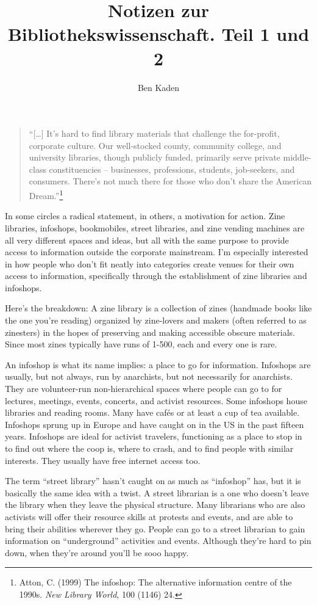 \documentclass[output=paper]{langscibook}
\title{Notizen zur Bibliothekswissenschaft. Teil 1 und 2}
\author{Ben Kaden}
\begin{document}
\maketitle

\begin{quote}
\enquote{{[}\ldots{]} It's hard to find library materials that challenge
the for-profit, corporate culture. Our well-stocked county, community
college, and university libraries, though publicly funded, primarily
serve private middle-class constituencies -- businesses, professions,
students, job-seekers, and consumers. There's not much there for those
who don't share the American Dream.}\footnote{Atton, C. (1999) The
  infoshop: The alternative information centre of the 1990s. \emph{New
  Library World}, 100 (1146) 24.}
\end{quote}

In some circles a radical statement, in others, a motivation for action.
Zine libraries, infoshops, bookmobiles, street libraries, and zine
vending machines are all very different spaces and ideas, but all with
the same purpose to provide access to information outside the corporate
mainstream. I'm especially interested in how people who don't fit neatly
into categories create venues for their own access to information,
specifically through the establishment of zine libraries and infoshops.

Here's the breakdown: A zine library is a collection of zines (handmade
books like the one you're reading) organized by zine-lovers and makers
(often referred to as zinesters) in the hopes of preserving and making
accessible obscure materials. Since most zines typically have runs of
1-500, each and every one is rare.

An infoshop is what its name implies: a place to go for information.
Infoshops are usually, but not always, run by anarchists, but not
necessarily for anarchists. They are volunteer-run non-hierarchical
spaces where people can go to for lectures, meetings, events, concerts,
and activist resources. Some infoshops house libraries and reading
rooms. Many have cafés or at least a cup of tea available. Infoshops
sprung up in Europe and have caught on in the US in the past fifteen
years. Infoshops are ideal for activist travelers, functioning as a
place to stop in to find out where the coop is, where to crash, and to
find people with similar interests. They usually have free internet
access too.

The term \enquote{street library} hasn't caught on as much as
\enquote{infoshop} has, but it is basically the same idea with a twist.
A street librarian is a one who doesn't leave the library when they
leave the physical structure. Many librarians who are also activists
will offer their resource skills at protests and events, and are able to
bring their abilities wherever they go. People can go to a street
librarian to gain information on \enquote{underground} activities and
events. Although they're hard to pin down, when they're around you'll be
sooo happy.
\end{document}

